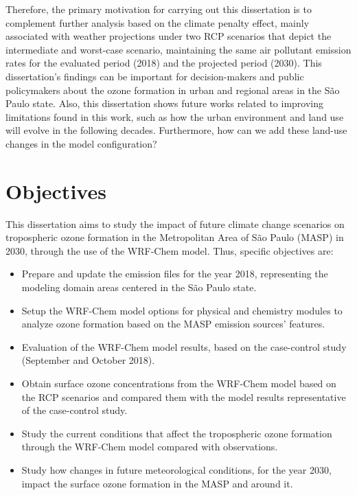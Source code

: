 Therefore, the primary motivation for carrying out this dissertation is to complement further analysis based on the climate penalty effect, mainly associated with weather projections under two RCP scenarios that depict the intermediate and worst-case scenario, maintaining the same air pollutant emission rates for the evaluated period (2018) and the projected period (2030).
This dissertation's findings can be important for decision-makers and public policymakers about the ozone formation in urban and regional areas in the S\~{a}o Paulo state.
Also, this dissertation shows future works related to improving limitations found in this work, such as how the urban environment and land use will evolve in the following decades.
Furthermore, how can we add these land-use changes in the model configuration?


\section{Objectives}\label{sec:obj}
	
	This dissertation aims to study the impact of future climate change scenarios on tropospheric ozone formation in the Metropolitan Area of S\~{a}o Paulo (MASP) in 2030, through the use of the WRF-Chem model. Thus, specific objectives are:
	
	\begin{itemize}
		\item Prepare and update the emission files for the year 2018, representing the modeling domain areas centered in the S\~{a}o Paulo state.
		\item Setup the WRF-Chem model options for physical and chemistry modules to analyze ozone formation based on the MASP emission sources' features. 
		\item Evaluation of the WRF-Chem model results, based on the case-control study (September and October 2018).
		\item Obtain surface ozone concentrations from the WRF-Chem model based on the RCP scenarios and compared them with the model results representative of the case-control study.
		\item Study the current conditions that affect the tropospheric ozone formation through the WRF-Chem model compared with observations.
		\item Study how changes in future meteorological conditions, for the year 2030, impact the surface ozone formation in the MASP and around it.
	\end{itemize}
	
